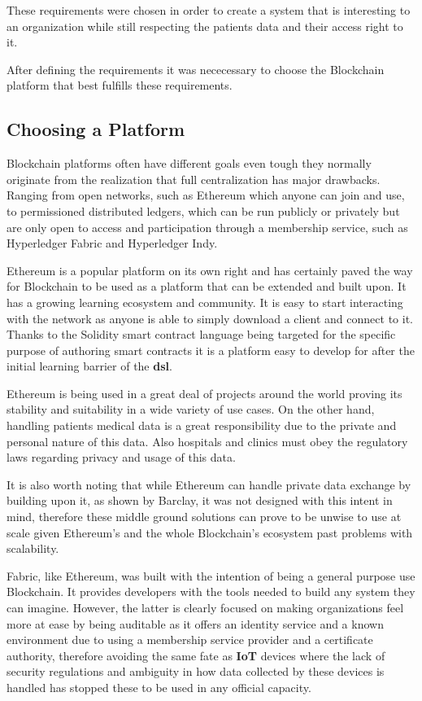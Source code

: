 These requirements were chosen in order to create a system that is interesting
to an organization while still respecting the patients data and their access
right to it. 

After defining the requirements it was nececessary to choose the Blockchain
platform that best fulfills these requirements.


\subsection{Choosing a Platform}\label{choosePlatform}

Blockchain platforms often have different goals even tough they normally
originate from the realization that full centralization has major drawbacks.
Ranging from open networks, such as Ethereum which anyone can join and use, to
permissioned distributed ledgers, which can be run publicly or privately but
are only open to access and participation through a membership service, such as
Hyperledger Fabric and Hyperledger Indy.

Ethereum is a popular platform on its own right and has certainly paved the way
for Blockchain to be used as a platform that can be extended and built upon. It
has a growing learning ecosystem and community. It is easy to start interacting
with the network as anyone is able to simply download a client and connect to
it.  Thanks to the Solidity smart contract language being targeted for the
specific purpose of authoring smart contracts it is a platform easy to develop
for after the initial learning barrier of the \textbf{dsl}. 

Ethereum is being used in a great deal of projects around the world proving its
stability and suitability in a wide variety of use cases. On the other hand,
handling patients medical data is a great responsibility due to the private and
personal nature of this data. Also hospitals and clinics must obey the
regulatory laws regarding privacy and usage of this data.

It is also worth noting that while Ethereum can handle private data exchange by
building upon it, as shown by Barclay, it was not designed with this intent in
mind, therefore these middle ground solutions can prove to be unwise to use at
scale given Ethereum's and the whole Blockchain's ecosystem past problems with
scalability.  

Fabric, like Ethereum, was built with the intention of being a general purpose
use Blockchain. It provides developers with the tools needed to build any
system they can imagine. However, the latter is clearly focused on making
organizations feel more at ease by being auditable as it offers an identity
service and a known environment due to using a membership service provider and
a certificate authority, therefore avoiding the same fate as \textbf{IoT}
devices where the lack of security regulations and ambiguity in how data
collected by these devices is handled has stopped these to be used in any
official capacity.

